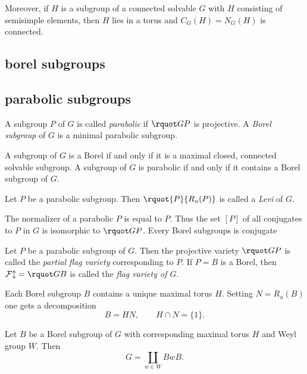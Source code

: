 \documentclass[english, no-theorem-numbers]{short-notes}
\begin{document}
Moreover, if $H$ is a subgroup of a connected solvable $G$ with $H$ consisting of semisimple elements, then $H$ lies in a torus and $C_G(H) = N_G(H)$ is connected.

\subsection*{borel subgroups}

\subsection*{parabolic subgroups}

\begin{Def}
    A subgroup $P$ of $G$ is called \emph{parabolic} if $\rquot GP$ is projective.
    A \emph{Borel subgroup} of $G$ is a minimal parabolic subgroup.
\end{Def}

\begin{Prop}
    A subgroup of $G$ is a Borel if and only if it is a maximal closed, connected solvable subgroup.
    A subgroup of $G$ is parabolic if and only if it contains a Borel subgroup of $G$.
\end{Prop}

\begin{Def}
    Let $P$ be a parabolic subgroup.
    Then $\rquot{P}{R_u(P)}$ is called a \emph{Levi} of $G$.
\end{Def}

The normalizer of a parabolic $P$ is equal to $P$. 
Thus the set $[P]$ of all conjugates to $P$ in $G$ is isomorphic to $\rquot GP$.
Every Borel subgroups is conjugate

\begin{Def}
    Let $P$ be a parabolic subgroup of $G$.
    Then the projective variety $\rquot GP$ is called the \emph{partial flag variety} corresponding to $P$.
    If $P = B$ is a Borel, then $\mathcal{Fl} = \rquot GB$ is called the \emph{flag variety of $G$}.
\end{Def}


Each Borel subgroup $B$ contains a unique maximal torus $H$.
Setting $N = R_u(B)$ one gets a decomposition
\[
    B = HN, \qquad H∩N = \{1\}.
\]

\begin{Thm}
    Let $B$ be a Borel subgroup of $G$ with corresponding maximal torus $H$ and Weyl group $W$.
    Then
    \[
        G = \coprod_{w ∈ W} BwB.
    \]
\end{Thm}
\end{document}
